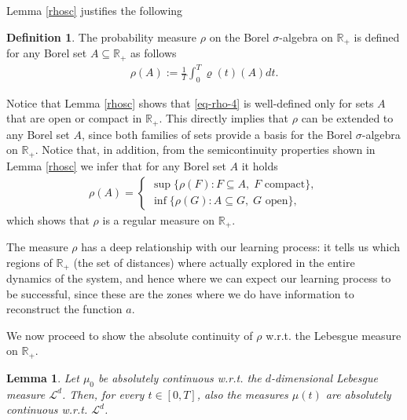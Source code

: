 \documentclass[A4paper,11pt]{article}
\newtheorem{lemma}[theorem]{Lemma}
\theoremstyle{definition}
\newtheorem{definition}[theorem]{Definition}
\newcommand{\R}{\mathbb{R}}
\newcommand{\cl}{\mathcal{L}}
\begin{document}
Lemma \ref{rhosc} justifies the following
\begin{definition}
The probability measure $\rho$ on the Borel $\sigma$-algebra on $\R_+$ is defined for any Borel set $A \subseteq \R_+$ as follows
\begin{align}\label{eq-rho-4}
	\rho(A):=\frac{1}{T}\int_0^T\varrho(t)(A)dt.
\end{align}
\end{definition}
Notice that Lemma \ref{rhosc} shows that \eqref{eq-rho-4} is well-defined only for sets $A$ that are open or compact in $\R_+$. This directly implies that $\rho$ can be extended to any Borel set $A$, since both families of sets provide a basis for the Borel $\sigma$-algebra on $\R_+$. Notice that, in addition, from the semicontinuity properties shown in Lemma \ref{rhosc} we infer that for any Borel set $A$ it holds
\begin{align*}
	\rho(A) = \begin{cases}
	\sup\{\rho(F) : F \subseteq A, \;F \text{ compact}\},\\
	\inf\{\rho(G) : A \subseteq G, \;G \text{ open}\},
	\end{cases}
\end{align*}
which shows that $\rho$ is a regular measure on $\R_+$.

\vspace{0.3cm}

The measure $\rho$ has a deep relationship with our learning process: it tells us which regions of $\R_+$ (the set of distances) where actually explored in the entire dynamics of the system, and hence where we can expect our learning process to be successful, since these are the zones where we do have information to reconstruct the function $a$.

We now proceed to show the absolute continuity of $\rho$ w.r.t. the Lebesgue measure on $\R_+$.

\begin{lemma}\label{lemma-AC-1}
	Let $\mu_0$ be absolutely continuous w.r.t. the $d$-dimensional Lebesgue measure $\cl^d$. Then, for every
	$t\in [0,T]$, also the measures $\mu(t)$ are absolutely continuous w.r.t. $\cl^d$.
\end{lemma}
\end{document}
